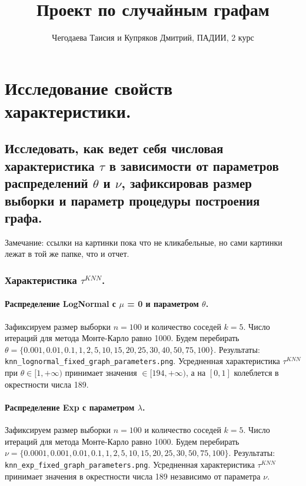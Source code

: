 \documentclass{report}
\title{Проект по случайным графам}
\author{Чегодаева Таисия и Купряков Дмитрий, ПАДИИ, 2 курс}
\begin{document}
\maketitle

\part{Исследование свойств характеристики.}
\chapter{Исследовать, как ведет себя числовая характеристика $\tau$ в зависимости от параметров распределений $\theta$ и $\nu$, зафиксировав размер выборки и параметр процедуры построения графа.}
Замечание: ссылки на картинки пока что не кликабельные, но сами картинки лежат в той же папке, что и отчет.
\section{Характеристика $\tau^{KNN}$.}
\subsection{Распределение LogNormal с $\mu$ = 0 и параметром $\theta$.}
Зафиксируем размер выборки $n = 100$ и количество соседей $k = 5$. Число итераций для метода Монте-Карло равно 1000.
\newline
\newline
Будем перебирать $\theta = \{0.001, 0.01, 0.1, 1, 2, 5, 10, 15, 20, 25, 30, 40, 50, 75, 100\}$.
\newline
\newline
Результаты: \texttt{knn\_lognormal\_fixed\_graph\_parameters.png}.
\newline
\newline
Усредненная характеристика $\tau^{KNN}$ при $\theta \in [1, + \infty)$ принимает значения $\in [194, + \infty)$, а на $[0, 1]$ колеблется в окрестности числа 189.

\subsection{Распределение Exp с параметром $\lambda$.}
Зафиксируем размер выборки $n = 100$ и количество соседей $k = 5$. Число итераций для метода Монте-Карло равно 1000.
\newline
\newline
Будем перебирать $\nu = \{0.0001, 0.001, 0.01, 0.1, 1, 2, 5, 10, 15, 20, 25, 30, 50, 75, 100\}$.
\newline
\newline
Результаты: \texttt{knn\_exp\_fixed\_graph\_parameters.png}.
\newline
\newline
Усредненная характеристика $\tau^{KNN}$ принимает значения в окрестности числа 189 независимо от параметра $\nu$.
\end{document}
